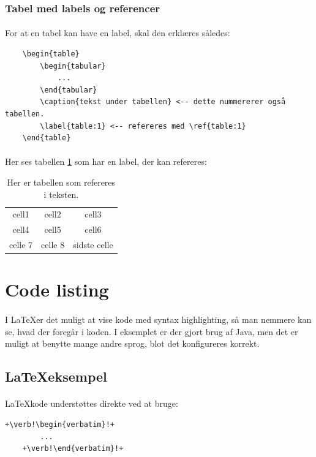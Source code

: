 \documentclass{article}
\begin{document}
\subsubsection{Tabel med labels og referencer}
\paragraph{}
For at en tabel kan have en label, skal den erklæres således:
\begin{verbatim}
    \begin{table}
        \begin{tabular}
            ...
        \end{tabular}
        \caption{tekst under tabellen} <-- dette nummererer også tabellen.
        \label{table:1} <-- refereres med \ref{table:1}
    \end{table}
\end{verbatim}
\paragraph{}
Her ses tabellen \ref{table:1} som har en label, der kan refereres:
\begin{table}[h!]
    \centering
    \begin{tabular}{ c c c }
        cell1 & cell2 & cell3 \\
        cell4 & cell5 & cell6 \\
        celle 7 & celle 8 & sidste celle
    \end{tabular}
    \caption{Her er tabellen som refereres i teksten.}
    \label{table:1}
\end{table}
\newpage
\section{Code listing}
\paragraph{}
I \LaTeX er det muligt at vise kode med syntax highlighting, så man nemmere kan se, hvad der foregår i koden. I eksemplet er der gjort brug af Java, men det er muligt at benytte mange andre sprog, blot det konfigureres korrekt.
\subsection{\LaTeX eksempel}
\paragraph{}
\LaTeX kode understøttes direkte ved at bruge:
\begin{lstlisting}[escapechar=+]
    +\verb!\begin{verbatim}!+
        ...
    +\verb!\end{verbatim}!+
\end{lstlisting}
\end{document}
